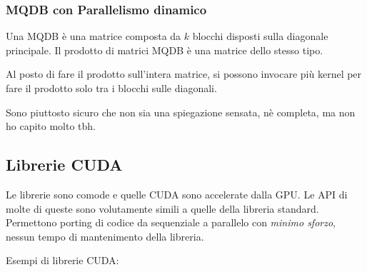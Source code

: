 \subsubsection{MQDB con Parallelismo dinamico}

Una MQDB è una matrice composta da $k$ blocchi disposti sulla diagonale principale. Il prodotto di matrici MQDB è una matrice dello stesso tipo.  

Al posto di fare il prodotto sull'intera matrice, si possono invocare più kernel per fare il prodotto solo tra i blocchi sulle diagonali.

Sono piuttosto sicuro che non sia una spiegazione sensata, nè completa, ma non ho capito molto tbh.

\subsection{Librerie CUDA}

Le librerie sono comode e quelle CUDA sono accelerate dalla GPU. Le API di molte di queste sono volutamente simili a quelle della libreria standard. Permettono porting di codice da sequenziale a parallelo con \textit{minimo sforzo}, nessun tempo di mantenimento della libreria.

Esempi di librerie CUDA:
\begin{center}
\end{center}

